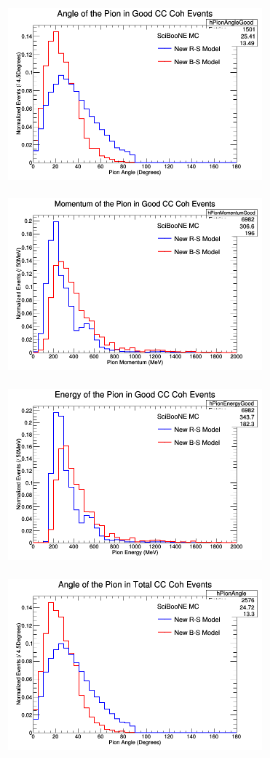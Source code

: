 \documentclass[11pt]{article}
\begin{document}
\begin{figure}[H]
\centering
\includegraphics[width=0.6\textwidth]{ANMPionPlottingImages/7-ANMPionPlotting.png}
\caption{}
\end{figure}

\begin{figure}[H]
\centering
\includegraphics[width=0.6\textwidth]{ANMPionPlottingImages/8-ANMPionPlotting.png}
\caption{}
\end{figure}

\begin{figure}[H]
\centering
\includegraphics[width=0.6\textwidth]{ANMPionPlottingImages/9-ANMPionPlotting.png}
\caption{}
\end{figure}

\begin{figure}[H]
\centering
\includegraphics[width=0.6\textwidth]{ANMPionPlottingImages/10-ANMPionPlotting.png}
\caption{}
\end{figure}
\end{document}
